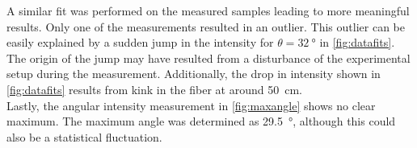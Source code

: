 A similar fit was performed on the measured samples leading to more meaningful results. Only one of the measurements resulted in an outlier. 
This outlier can be easily explained by a sudden jump in the intensity for $\theta=\qty{32}{\degree}$ in \autoref{fig:datafits}. 
The origin of the jump may have resulted from a disturbance of the experimental setup during the measurement. 
Additionally, the drop in intensity shown in \autoref{fig:datafits} results from kink in the fiber at around \qty{50}{\centi\meter}.\\
Lastly, the angular intensity measurement in \autoref{fig:maxangle} shows no clear maximum. The maximum angle was determined as \qty{29.5}{\degree}, although this could also be a statistical fluctuation.
